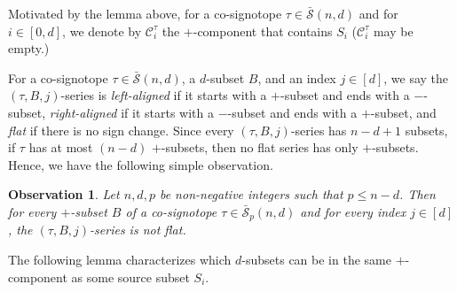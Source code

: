\documentclass[a4paper,11pt]{amsart}
\newtheorem{observation}[theorem]{Observation}
\newcommand{\C}{\mathcal{C}}
\newcommand{\calS}{\mathcal{S}}
\newcommand{\defi}[1]{\textcolor{defblue}{\emph{#1}}}
\begin{document}
Motivated by the lemma above, for a co-signotope $\tau \in \bar{\calS}(n,d)$ and for $i\in[0,d]$, we denote by $\C^{\tau}_i$ the $+$-component that contains $S_i$
($\C^{\tau}_i$ may be empty.)

For a co-signotope $\tau \in \bar{\calS}(n,d)$, a $d$-subset $B$, and an index $j \in [d]$, we say the $(\tau,B,j)$-series is \defi{left-aligned} if it starts with a $+$-subset and ends with a $-$-subset, \defi{right-aligned} if it starts with a $-$-subset and ends with a $+$-subset, and \defi{flat} if there is no sign change.
Since every $(\tau,B,j)$-series has $n-d+1$ subsets, if $\tau$ has at most $(n-d)$ $+$-subsets, then no flat series has only $+$-subsets.
Hence, we have the following simple observation.

\begin{observation}
\label{ob:no_flat}
    Let $n,d,p$ be non-negative integers such that $p \leq n-d$.
    Then for every $+$-subset $B$ of a co-signotope $\tau \in \bar{\calS}_p(n,d)$ and for every index $j \in [d]$, the $(\tau,B,j)$-series is not flat.
\end{observation}

The following lemma characterizes which $d$-subsets can be in the same $+$-component as some source subset $S_i$.
\end{document}
